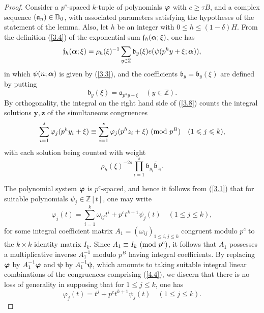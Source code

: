\documentclass[12pt,reqno]{amsart}
\theoremstyle{definition}
\theoremstyle{remark}
\numberwithin{equation}{section}
\newcommand{\mmod}[1]{\,\,(\text{\rm mod}\,\,#1)}
\def\bfy{{\mathbf y}}
\def\bfz{{\mathbf z}}
\def\dbZ{{\mathbb Z}}\def\dbQ{{\mathbb Q}}
\def\gra{{\mathfrak a}}\def\grA{{\mathfrak A}}\def\bfgra{{\boldsymbol \gra}}
\def\grb{{\mathfrak b}}\def\grB{{\mathfrak B}}\def\bfgrb{{\boldsymbol \grb}}
\def\grf{{\mathfrak f}}\def\grF{{\mathfrak F}}
\def\del{{\delta}} \def\Del{{\Delta}} \def\Deltil{{\widetilde \Delta}}
\def\bfpsi{{\boldsymbol \psi}} \def\bfPsi{{\boldsymbol \Psi}}
\def\ome{{\omega}} \def\Ome{{\Omega}}
\def\le{\leqslant} \def\ge{\geqslant} \def\pleq{\preccurlyeq} \def\ple{\prec}
\begin{document}
\begin{proof} Consider a $p^c$-spaced $k$-tuple of polynomials ${\boldsymbol \varphi}$ with $c\ge 
\tau B$, and a complex sequence $(\gra_n)\in \dbD_0$, with associated parameters 
satisfying the hypotheses of the statement of the lemma. Also, let $h$ be an integer with 
$0\le h\le (1-\del)H$. From the definition (\ref{3.4}) of the exponential sum 
$\grf_h(\bfalp;\xi)$, one has
\begin{equation}\label{4.2}
\grf_h(\bfalp;\xi)=\rho_h(\xi)^{-1}\sum_{y\in \dbZ}\grb_y(\xi)e(\psi(p^hy+\xi;\bfalp)),
\end{equation}
in which $\psi(n;{\boldsymbol \alpha})$ is given by (\ref{3.3}), and the coefficients $\grb_y=\grb_y(\xi)$ 
are defined by putting
\begin{equation}\label{4.3}
\grb_y(\xi)=\gra_{p^hy+\xi}\quad (y\in \dbZ).
\end{equation}
By orthogonality, the integral on the right hand side of (\ref{3.8}) counts the integral 
solutions $\bfy,\bfz$ of the simultaneous congruences
\begin{equation}\label{4.4}
\sum_{i=1}^s\varphi_j(p^hy_i+\xi)\equiv \sum_{i=1}^s\varphi_j(p^hz_i+\xi)
\mmod{p^B}\quad (1\le j\le k),
\end{equation}
with each solution being counted with weight
\begin{equation}\label{4.5}
\rho_h(\xi)^{-2s}\prod_{i=1}^s\grb_{y_i}{\overline \grb_{z_i}}.
\end{equation}

\par The polynomial system ${\boldsymbol \varphi}$ is $p^c$-spaced, and hence it follows from 
(\ref{3.1}) that for suitable polynomials $\psi_j\in \dbZ[t]$, one may write
$$\varphi_j(t)=\sum_{i=1}^k\ome_{ij}t^i+p^ct^{k+1}\psi_j(t)\quad (1\le j\le k),$$
for some integral coefficient matrix $A_1=(\ome_{ij})_{1\le i,j\le k}$ congruent modulo 
$p^c$ to the $k\times k$ identity matrix $I_k$. Since $A_1\equiv I_k\mmod{p^c}$, it 
follows that $A_1$ possesses a multiplicative inverse $A_1^{-1}$ modulo $p^B$ having 
integral coefficients. By replacing ${\boldsymbol \varphi}$ by $A_1^{-1}{\boldsymbol \varphi}$ and $\bfpsi$ by 
$A_1^{-1}\bfpsi$, which amounts to taking suitable integral linear combinations of the 
congruences comprising (\ref{4.4}), we discern that there is no loss of generality in 
supposing that for $1\le j\le k$, one has
\begin{equation}\label{4.6}
\varphi_j(t)=t^j+p^ct^{k+1}\psi_j(t)\quad (1\le j\le k).
\end{equation}


\end{proof}
\end{document}
